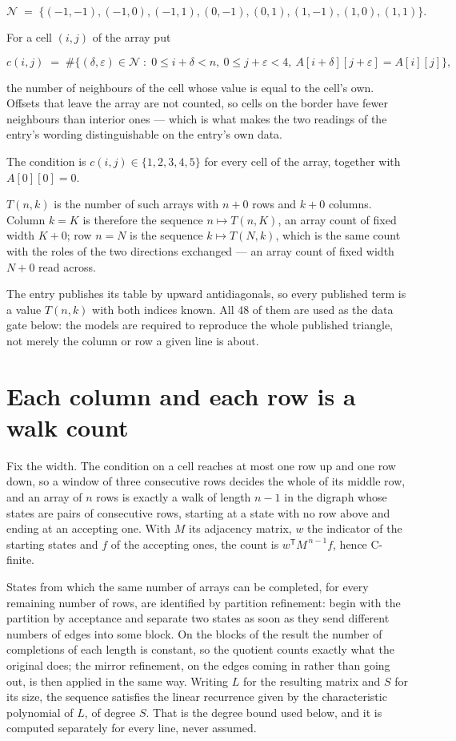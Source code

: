 \documentclass[11pt]{article}
\theoremstyle{definition}
\begin{document}
\[\mathcal{N} \;=\; \{(-1,-1), (-1,0), (-1,1), (0,-1), (0,1), (1,-1), (1,0), (1,1)\}.\]

For a cell $(i,j)$ of the array put

\[c(i,j) \;=\; \#\bigl\{(\delta,\varepsilon)\in\mathcal{N} \;:\; 0\le i+\delta<n,\ 0\le j+\varepsilon<4,\ A[i+\delta][j+\varepsilon] = A[i][j]\bigr\},\]

the number of neighbours of the cell whose value is equal to the cell's own. Offsets that leave the array are not counted, so cells on the border have fewer neighbours than interior ones --- which is what makes the two readings of the entry's wording distinguishable on the entry's own data.

The condition is $c(i,j) \in \{1, 2, 3, 4, 5\}$ for every cell of the array, together with $A[0][0]=0$.

$T(n,k)$ is the number of such arrays with $n + 0$ rows and $k + 0$ columns. Column $k = K$ is therefore the sequence $n \mapsto T(n,K)$, an array count of fixed width $K + 0$; row $n = N$ is the sequence $k \mapsto T(N,k)$, which is the same count with the roles of the two directions exchanged --- an array count of fixed width $N + 0$ read across.

The entry publishes its table by upward antidiagonals, so every published term is a value $T(n,k)$ with both indices known. All 48 of them are used as the data gate below: the models are required to reproduce the whole published triangle, not merely the column or row a given line is about.

\section{Each column and each row is a walk count}

Fix the width. The condition on a cell reaches at most one row up and one row down, so a window of three consecutive rows decides the whole of its middle row, and an array of $n$ rows is exactly a walk of length $n-1$ in the digraph whose states are pairs of consecutive rows, starting at a state with no row above and ending at an accepting one. With $M$ its adjacency matrix, $w$ the indicator of the starting states and $f$ of the accepting ones, the count is $w^{\mathsf T}M^{\,n-1}f$, hence C-finite.

States from which the same number of arrays can be completed, for every remaining number of rows, are identified by partition refinement: begin with the partition by acceptance and separate two states as soon as they send different numbers of edges into some block. On the blocks of the result the number of completions of each length is constant, so the quotient counts exactly what the original does; the mirror refinement, on the edges coming in rather than going out, is then applied in the same way. Writing $L$ for the resulting matrix and $S$ for its size, the sequence satisfies the linear recurrence given by the characteristic polynomial of $L$, of degree $S$. That is the degree bound used below, and it is computed separately for every line, never assumed.
\end{document}
